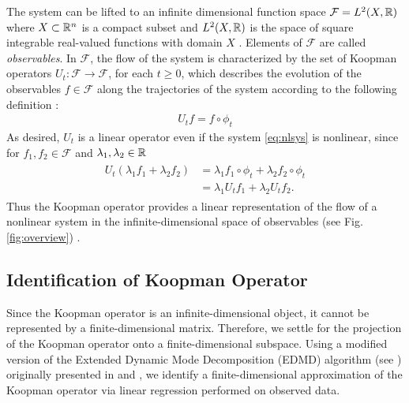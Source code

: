The system can be lifted to an infinite dimensional function space $\mathcal{F} = L^2(X, \mathbb{R})$ where $X \subset \mathbb{R}^n$ is a compact subset and $L^2(X , \mathbb{R})$ is the space of square integrable real-valued functions with domain $X$ .
Elements of $\mathcal{F}$ are called \emph{observables}.
In $\mathcal{F}$, the flow of the system is characterized by the set %
of Koopman operators 
$U_t : \mathcal{F} \to \mathcal{F}$, for each $t \geq 0$,
which describes the evolution of the observables ${f \in \mathcal{F}}$ along the trajectories of the system according to the following definition :
\begin{align}
    U_t f = f \circ \phi_t      
    \label{eq:koopman}
\end{align}
As desired, $U_t$ is a linear operator even if the system \eqref{eq:nlsys} is nonlinear, since for $f_1, f_2 \in \mathcal{F}$ and $\lambda_1, \lambda_2 \in \mathbb{R}$
\begin{align}
    \begin{split}
    U_t (\lambda_1 f_1 + \lambda_2 f_2) &= \lambda_1 f_1 \circ \phi_t + \lambda_2 f_2 \circ \phi_t \\
    &= \lambda_1 U_t f_1 + \lambda_2 U_t f_2.
    \end{split}
\end{align}
Thus the Koopman operator provides a linear representation of the flow of a nonlinear system in the infinite-dimensional space of observables (see Fig. \ref{fig:overview}) \cite{budivsic2012applied} .


\subsection{Identification of Koopman Operator}
\label{sec:koopid}

Since the Koopman operator is an infinite-dimensional object, it cannot be represented by a finite-dimensional matrix. 
Therefore, we settle for the projection of the Koopman operator onto a finite-dimensional subspace.
Using a modified version of the Extended Dynamic Mode Decomposition (EDMD) algorithm (see \cite{williams2015data}) originally presented in \cite{mauroy2016linear} and \cite{mauroy2017koopman}, we identify a finite-dimensional approximation of the Koopman operator via linear regression performed on observed data.

